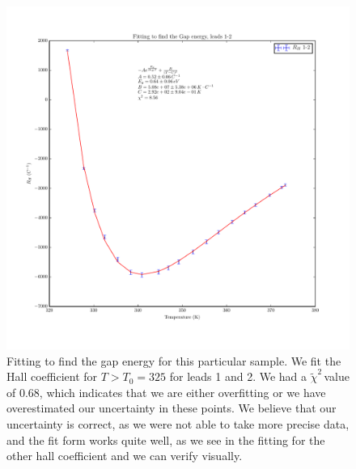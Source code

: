 \documentclass[reprint, nobibnotes, amssymb, amsmath, amsfonts, physics, mathtools, mathrsfs, floatfix]{revtex4-1}
\newcommand{\redchi}{$\tilde{\chi}^2\,$}
\begin{document}
\begin{widetext}
      \begin{figure}[h]
        \centering
        \includegraphics[width=\linewidth]{../plots/rh_12_eg.pdf}
        \caption{Fitting to find the gap energy for this particular sample.  We fit the Hall coefficient for $T > T_0 = 325$ for leads 1 and 2.  We had a \redchi value of 0.68, which indicates that we are either overfitting or we have overestimated our uncertainty in these points.  We believe that our uncertainty is correct, as we were not able to take more precise data, and the fit form works quite well, as we see in the fitting for the other hall coefficient and we can verify visually. \label{rh_12_eg}}
      \end{figure}


\end{widetext}
\end{document}
